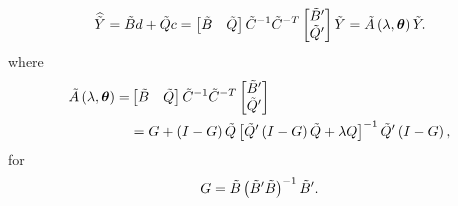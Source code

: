 \begin{equation} \label{eq:tildeY-hat-equals-tildeA-tildeY}
\widehat{\tilde{Y}} = \tilde{B} d + \tilde{Q} c = \begin{bmatrix} \tilde{B} & \tilde{Q} \end{bmatrix} \tilde{C}^{-1} \tilde{C}^{-T} \begin{bmatrix} \tilde{B}' \\ \tilde{Q}' \end{bmatrix} \tilde{Y} = \tilde{A}\left(\lambda, \mbox{\boldmath $\theta$}\right) \tilde{Y}.
\end{equation} 
\noindent
where
\begin{align}
\begin{split} \label{eq:smoothing-matrix-A-tilde}
\tilde{A}\left(\lambda, \mbox{\boldmath $\theta$} \right) =& \begin{bmatrix} \tilde{B} & \tilde{Q} \end{bmatrix} \tilde{C}^{-1} \tilde{C}^{-T} \begin{bmatrix} \tilde{B}' \\ \tilde{Q}' \end{bmatrix}  \\
&= G + \left(I - G\right) \tilde{Q} \left[\tilde{Q}'\left( I - G \right)\tilde{Q} + \lambda Q\right]^{-1} \tilde{Q}'\left(I - G\right),
\end{split}
\end{align} 
\noindent
for
\[
G = \tilde{B}\left(\tilde{B}' \tilde{B} \right)^{-1}\tilde{B}'.
\]





